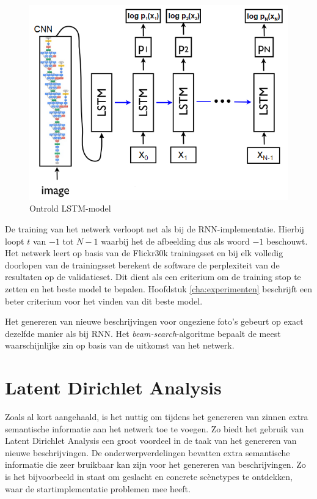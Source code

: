 \begin{figure}[tb]
	\centering
	\includegraphics[width=1\linewidth]{Images/vinyals_karpathy.PNG}
	\caption[Ontrold LSTM-model]{Ontrold LSTM-model~\cite{Google}}
	\label{fig:vinyals:karpathy}
\end{figure}

De training van het netwerk verloopt net als bij de RNN-implementatie. Hierbij loopt $t$ van $-1$ tot $N-1$ waarbij het de afbeelding dus als woord $-1$ beschouwt. Het netwerk leert op basis van de Flickr30k trainingsset en bij elk volledig doorlopen van de trainingsset berekent de software de perplexiteit van de resultaten op de validatieset. Dit dient als een criterium om de training stop te zetten en het beste model te bepalen. Hoofdstuk \ref{cha:experimenten} beschrijft een beter criterium voor het vinden van dit beste model.


Het genereren van nieuwe beschrijvingen voor ongeziene foto's gebeurt op exact dezelfde manier als bij RNN. Het \emph{beam-search}-algoritme bepaalt de meest waarschijnlijke zin op basis van de uitkomst van het netwerk.


\section{Latent Dirichlet Analysis}
\label{sec:LDAglobal}
Zoals al kort aangehaald, is het nuttig om tijdens het genereren van zinnen extra semantische informatie aan het netwerk toe te voegen.
Zo biedt het gebruik van Latent Dirichlet Analysis een groot voordeel in de taak van het genereren van nieuwe beschrijvingen. De onderwerpverdelingen bevatten extra semantische informatie die zeer bruikbaar kan zijn voor het genereren van beschrijvingen. Zo is het bijvoorbeeld in staat om geslacht en concrete sc\`enetypes te ontdekken, waar de startimplementatie problemen mee heeft.


